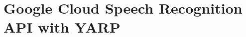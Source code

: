 \chapter{Google Cloud Speech Recognition API with YARP}
\label{md__2home_2runner_2work_2speech_2speech_2gh-pages_2speechInteraction_2modules_2googleSpeech_2README}
